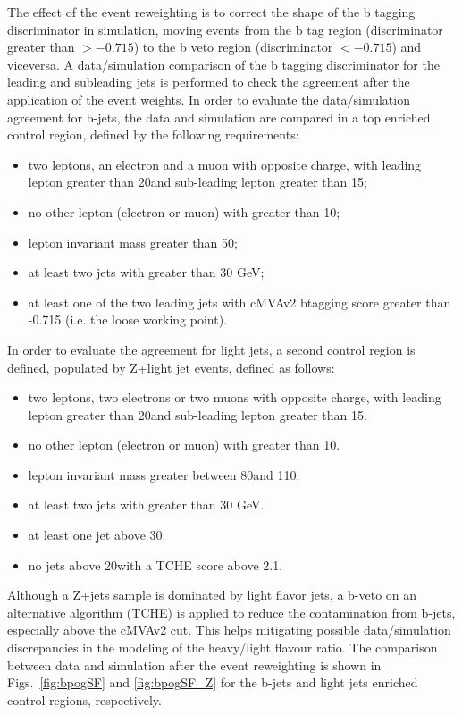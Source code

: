 The effect of the event reweighting is to correct the shape of the b tagging discriminator in simulation, moving events from the b tag region (discriminator greater than $> -0.715$) to the b veto region (discriminator $ < -0.715$) and viceversa. A data/simulation comparison of the b tagging discriminator for the leading and subleading jets is performed to check the agreement after the application of the event weights. In order to evaluate the data/simulation agreement for b-jets, the data and simulation are compared in a top enriched control region, defined by the following requirements:
\begin{itemize}
\item two leptons, an electron and a muon with opposite charge, with
leading lepton \pt greater than 20\GeV and sub-leading lepton \pt greater than
15\GeV;
\item no other lepton (electron or muon) with \pt greater than 10\GeV;
\item lepton invariant mass greater than 50\GeV;
\item at least two jets with \pt greater than 30 GeV;
\item at least one of the two leading jets with cMVAv2 btagging score
greater than -0.715 (i.e. the loose working point).
\end{itemize}
In order to evaluate the agreement for light jets, a second
control region is defined, populated by Z+light jet events, defined as follows:
\begin{itemize}
\item two leptons, two electrons or two muons with opposite charge, with
leading lepton \pt greater than 20\GeV and sub-leading lepton \pt greater than
15\GeV.
\item no other lepton (electron or muon) with \pt greater than 10\GeV.
\item lepton invariant mass greater between 80\GeV and 110\GeV.
\item at least two jets with \pt greater than 30 GeV.
\item at least one jet above 30\GeV.
\item no jets above 20\GeV with a TCHE score above 2.1. 
\end{itemize}
Although a Z+jets sample is dominated by light flavor jets, a b-veto on an
alternative algorithm (TCHE) is applied to reduce the contamination from b-jets,
especially above the cMVAv2 cut.  This helps mitigating possible data/simulation discrepancies in the modeling of the heavy/light flavour ratio.
The comparison between data and simulation after the event reweighting is shown in Figs.~\ref{fig:bpogSF} and \ref{fig:bpogSF_Z} for the b-jets and light jets enriched control regions, respectively.

